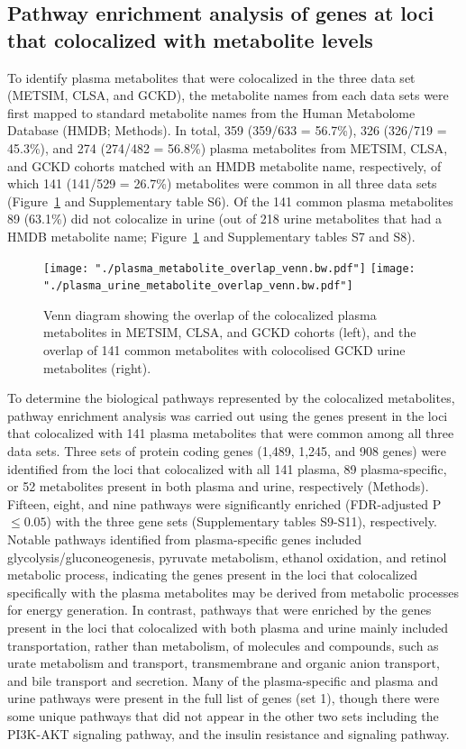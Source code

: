 \documentclass[gucdd,article,submit,pdftex,moreauthors]{Definitions/mdpi}
\begin{document}
\subsection{Pathway enrichment analysis of genes at loci that colocalized with metabolite levels}
To identify plasma metabolites that were colocalized in the three data set (METSIM, CLSA, and GCKD), the metabolite names from each data sets were first mapped to standard metabolite names from the Human Metabolome Database (HMDB; Methods).
In total, 359 (359/633 = 56.7\%), 326 (326/719 = 45.3\%), and 274 (274/482 = 56.8\%) plasma metabolites from METSIM, CLSA, and GCKD cohorts matched with an HMDB metabolite name, respectively, of which 141 (141/529 = 26.7\%) metabolites were common in all three data sets (Figure~\ref{fig:venn} and Supplementary table S6).
Of the 141 common plasma metabolites 89 (63.1\%) did not colocalize in urine (out of 218 urine metabolites that had a HMDB metabolite name; Figure~\ref{fig:venn} and Supplementary tables S7 and S8).

\begin{figure}
	\texttt{[image: "./plasma\_metabolite\_overlap\_venn.bw.pdf"]}
	\texttt{[image: "./plasma\_urine\_metabolite\_overlap\_venn.bw.pdf"]}
	\caption{Venn diagram showing the overlap of the colocalized plasma metabolites in METSIM, CLSA, and GCKD cohorts (left), and the overlap of 141 common metabolites with colocolised GCKD urine metabolites (right).}
	\label{fig:venn}
\end{figure}

To determine the biological pathways represented by the colocalized metabolites, pathway enrichment analysis was carried out using the genes present in the loci that colocalized with 141 plasma metabolites that were common among all three data sets.
Three sets of protein coding genes (1,489, 1,245, and 908 genes) were identified from the loci that colocalized with all 141 plasma, 89 plasma-specific, or 52 metabolites present in both plasma and urine, respectively (Methods).
Fifteen, eight, and nine pathways were significantly enriched (FDR-adjusted P $\le 0.05$) with the three gene sets (Supplementary tables S9-S11), respectively.
Notable pathways identified from plasma-specific genes included glycolysis/gluconeogenesis, pyruvate metabolism, ethanol oxidation, and retinol metabolic process, indicating the genes present in the loci that colocalized specifically with the plasma metabolites may be derived from metabolic processes for energy generation.
In contrast, pathways that were enriched by the genes present in the loci that colocalized with both plasma and urine mainly included transportation, rather than metabolism, of molecules and compounds, such as urate metabolism and transport, transmembrane and organic anion transport, and bile transport and secretion.
Many of the plasma-specific and plasma and urine pathways were present in the full list of genes (set 1), though there were some unique pathways that did not appear in the other two sets including the PI3K-AKT signaling pathway, and the insulin resistance and signaling pathway.
\end{document}
